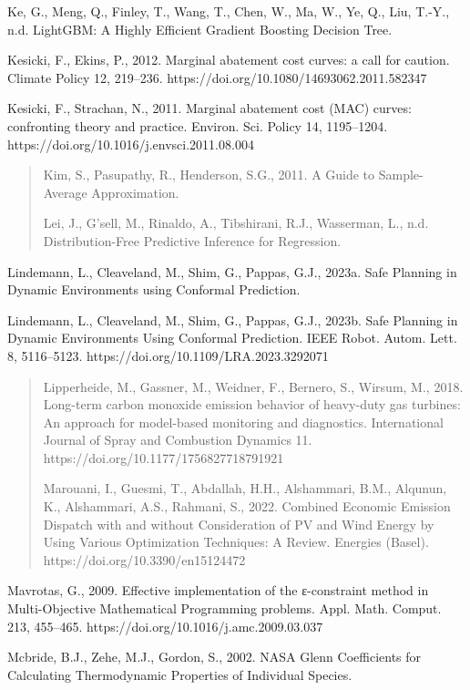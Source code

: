 \documentclass[11pt]{article}
\begin{document}
Ke, G., Meng, Q., Finley, T., Wang, T., Chen, W., Ma, W., Ye, Q., Liu,
T.-Y., n.d. LightGBM: A Highly Efficient Gradient Boosting Decision
Tree.

Kesicki, F., Ekins, P., 2012. Marginal abatement cost curves: a call for
caution. Climate Policy 12, 219--236.
https://doi.org/10.1080/14693062.2011.582347

Kesicki, F., Strachan, N., 2011. Marginal abatement cost (MAC) curves:
confronting theory and practice. Environ. Sci. Policy 14, 1195--1204.
https://doi.org/10.1016/j.envsci.2011.08.004

\begin{quote}
Kim, S., Pasupathy, R., Henderson, S.G., 2011. A Guide to Sample-Average
Approximation.

Lei, J., G'sell, M., Rinaldo, A., Tibshirani, R.J., Wasserman, L., n.d.
Distribution-Free Predictive Inference for Regression.
\end{quote}

Lindemann, L., Cleaveland, M., Shim, G., Pappas, G.J., 2023a. Safe
Planning in Dynamic Environments using Conformal Prediction.

Lindemann, L., Cleaveland, M., Shim, G., Pappas, G.J., 2023b. Safe
Planning in Dynamic Environments Using Conformal Prediction. IEEE Robot.
Autom. Lett. 8, 5116--5123. https://doi.org/10.1109/LRA.2023.3292071

\begin{quote}
Lipperheide, M., Gassner, M., Weidner, F., Bernero, S., Wirsum, M.,
2018. Long-term carbon monoxide emission behavior of heavy-duty gas
turbines: An approach for model-based monitoring and diagnostics.
International Journal of Spray and Combustion Dynamics 11.
https://doi.org/10.1177/1756827718791921

Marouani, I., Guesmi, T., Abdallah, H.H., Alshammari, B.M., Alqunun, K.,
Alshammari, A.S., Rahmani, S., 2022. Combined Economic Emission Dispatch
with and without Consideration of PV and Wind Energy by Using Various
Optimization Techniques: A Review. Energies (Basel).
https://doi.org/10.3390/en15124472
\end{quote}

Mavrotas, G., 2009. Effective implementation of the ε-constraint method
in Multi-Objective Mathematical Programming problems. Appl. Math.
Comput. 213, 455--465. https://doi.org/10.1016/j.amc.2009.03.037

Mcbride, B.J., Zehe, M.J., Gordon, S., 2002. NASA Glenn Coefficients for
Calculating Thermodynamic Properties of Individual Species.
\end{document}
